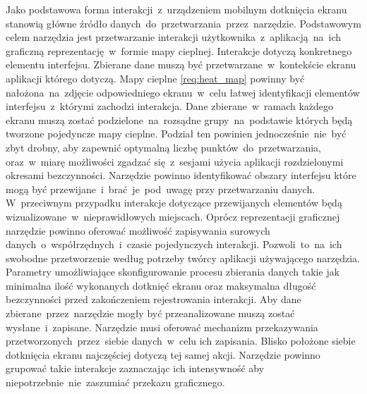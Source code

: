 \begin{enumerate}[label=\textbf{F.\arabic*}]
	 Jako podstawowa forma interakcji~z~urządzeniem mobilnym dotknięcia ekranu stanowią główne źródło danych~do~przetwarzania~przez~narzędzie.
	 Podstawowym celem narzędzia jest przetwarzanie interakcji użytkownika~z~aplikacją~na~ich graficzną reprezentację~w~formie mapy cieplnej. 
	 Interakcje dotyczą konkretnego elementu interfejsu. Zbierane dane muszą być przetwarzane~w~kontekście ekranu aplikacji którego dotyczą. Mapy cieplne \ref{req:heat_map} powinny być nałożona~na~zdjęcie odpowiedniego ekranu~w~celu łatwej identyfikacji elementów interfejsu~z~którymi zachodzi interakcja.
	 Dane zbierane~w~ramach każdego ekranu muszą zostać podzielone~na~rozsądne grupy~na~podstawie których będą tworzone pojedyncze mapy cieplne. Podział ten powinien jednocześnie~nie~być zbyt drobny, aby zapewnić optymalną liczbę punktów~do~przetwarzania, oraz~w~miarę możliwości zgadzać się~z~sesjami użycia aplikacji rozdzielonymi okresami bezczynności.
	 Narzędzie powinno identyfikować obszary interfejsu które mogą być przewijane~i~brać~je~pod~uwagę przy przetwarzaniu danych. W~przeciwnym przypadku interakcje dotyczące przewijanych elementów będą wizualizowane~w~nieprawidłowych miejscach.
	 Oprócz reprezentacji graficznej narzędzie powinno oferować możliwość zapisywania surowych danych~o~współrzędnych~i~czasie pojedynczych interakcji. Pozwoli~to~na~ich swobodne przetworzenie według potrzeby twórcy aplikacji używającego narzędzia.
	 Parametry umożliwiające skonfigurowanie procesu zbierania danych takie jak minimalna ilość wykonanych dotknięć ekranu oraz maksymalna długość bezczynności przed zakończeniem rejestrowania interakcji.
	 Aby dane zbierane~przez~narzędzie mogły być przeanalizowane muszą zostać wysłane~i~zapisane. Narzędzie musi oferować mechanizm przekazywania przetworzonych~przez~siebie danych~w~celu ich zapisania.
	 Blisko położone siebie dotknięcia ekranu najczęściej dotyczą tej samej akcji. Narzędzie powinno grupować takie interakcje zaznaczając ich intensywność aby niepotrzebnie~nie~zaszumiać przekazu graficznego.

\end{enumerate}
